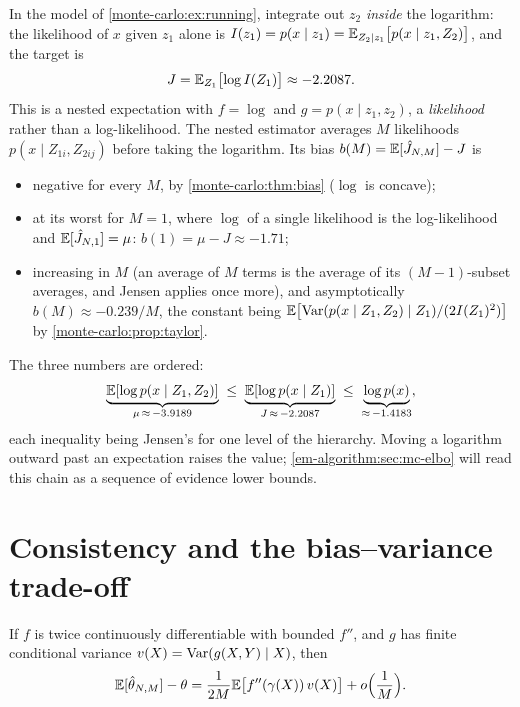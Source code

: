\begin{notechapter}
\begin{example}\label{monte-carlo:ex:running-nested}
In the model of \cref{monte-carlo:ex:running}, integrate out $z_2$ \emph{inside} the
logarithm: the likelihood of $x$ given $z_1$ alone is
$I(z_1) = p(x\mid z_1) = \mathbb{E}_{Z_2\mid z_1}\bigl[p(x\mid z_1,Z_2)\bigr]$, and the target is
\[
  J = \mathbb{E}_{Z_1}\bigl[\log I(Z_1)\bigr]\approx-2.2087 .
\]
This is a nested expectation with $f = \log$ and $g = p(x\mid z_1,z_2)$, a
\emph{likelihood} rather than a log-likelihood. The nested estimator averages $M$
likelihoods $p(x\mid Z_{1i},Z_{2ij})$ before taking the logarithm. Its bias
$b(M) = \mathbb{E}[\hat J_{N,M}] - J$ is
\begin{itemize}[nosep]
  \item negative for every $M$, by \cref{monte-carlo:thm:bias} ($\log$ is concave);
  \item at its worst for $M = 1$, where $\log$ of a single likelihood is the
        log-likelihood and $\mathbb{E}[\hat J_{N,1}] = \mu$: $b(1) = \mu - J\approx-1.71$;
  \item increasing in $M$ (an average of $M$ terms is the average of its
        $(M-1)$-subset averages, and Jensen applies once more), and asymptotically
        $b(M)\approx-0.239/M$, the constant being
        $\mathbb{E}\bigl[\operatorname{Var}(p(x\mid Z_1,Z_2)\mid Z_1)/(2I(Z_1)^2)\bigr]$ by
        \cref{monte-carlo:prop:taylor}.
\end{itemize}
The three numbers are ordered:
\[
  \underbrace{\mathbb{E}[\log p(x\mid Z_1,Z_2)]}_{\mu\,\approx\,-3.9189}\;\leq\;
  \underbrace{\mathbb{E}[\log p(x\mid Z_1)]}_{J\,\approx\,-2.2087}\;\leq\;
  \underbrace{\log p(x)}_{\approx\,-1.4183},
\]
each inequality being Jensen's for one level of the hierarchy. Moving a
logarithm outward past an expectation raises the value; \cref{em-algorithm:sec:mc-elbo}
will read this chain as a sequence of evidence lower bounds.
\end{example}

\section{Consistency and the bias--variance trade-off}\label{monte-carlo:sec:tradeoff}

\begin{proposition}\label{monte-carlo:prop:taylor}
If $f$ is twice continuously differentiable with bounded $f''$, and $g$ has finite
conditional variance $v(X) = \operatorname{Var}(g(X,Y)\mid X)$, then
\[
  \mathbb{E}[\hat\theta_{N,M}] - \theta = \frac{1}{2M}\mathbb{E}\bigl[f''(\gamma(X))\,v(X)\bigr] + o\Bigl(\frac1M\Bigr).
\]
\end{proposition}


\end{notechapter}
